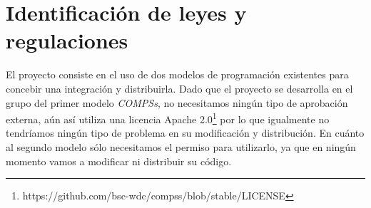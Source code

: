 \section{Identificación de leyes y regulaciones}

El proyecto consiste en el uso de dos modelos de programación existentes para concebir una integración y distribuirla. Dado que el proyecto se desarrolla en el grupo del primer modelo \textit{COMPSs}, no necesitamos ningún tipo de aprobación externa, aún así utiliza una licencia Apache 2.0\footnote{https://github.com/bsc-wdc/compss/blob/stable/LICENSE} por lo que igualmente no tendríamos ningún tipo de problema en su modificación y distribución. En cuánto al segundo modelo sólo necesitamos el permiso para utilizarlo, ya que en ningún momento vamos a modificar ni distribuir su código.


